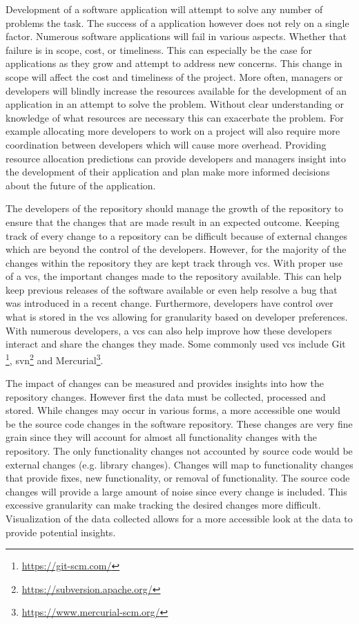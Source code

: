 Development of a software application will attempt to solve any number of problems the task. The success of a application however does not rely on a single factor. Numerous software applications will fail in various aspects. Whether that failure is in scope, cost, or timeliness. This can especially be the case for applications as they grow and attempt to address new concerns. This change in scope will affect the cost and timeliness of the project. More often, managers or developers will blindly increase the resources available for the development of an application in an attempt to solve the problem. Without clear understanding or knowledge of what resources are necessary this can exacerbate the problem. For example allocating more developers to work on a project will also require more coordination between developers which will cause more overhead. Providing resource allocation predictions can provide developers and managers insight into the development of their application and plan make more informed decisions about the future of the application.



The developers of the repository should manage the growth of the repository to ensure that the changes that are made result in an expected outcome. Keeping track of every change to a repository can be difficult because of external changes which are beyond the control of the developers. However, for the majority of the changes within the repository they are kept track through \gls{vcs}. With proper use of a \gls{vcs}, the important changes made to the repository available. This can help keep previous releases of the software available or even help resolve a bug that was introduced in a recent change. Furthermore, developers have control over what is stored in the \gls{vcs} allowing for granularity based on developer preferences. With numerous developers, a \gls{vcs} can also help improve how these developers interact and share the changes they made. Some commonly used \gls{vcs} include Git \footnote{\url{https://git-scm.com/}}, \gls{svn}\footnote{\url{https://subversion.apache.org/}} and Mercurial\footnote{\url{https://www.mercurial-scm.org/}}.

The impact of changes can be measured and provides insights into how the repository changes. However first the data must be collected, processed and stored. While changes may occur in various forms, a more accessible one would be the source code changes in the software repository. These changes are very fine grain since they will account for almost all functionality changes with the repository. The only functionality changes not accounted by source code would be external changes (e.g. library changes). Changes will map to functionality changes that provide fixes, new functionality, or removal of functionality. The source code changes will provide a large amount of noise since every change is included. This excessive granularity can make tracking the desired changes more difficult. Visualization of the data collected allows for a more accessible look at the data to provide potential insights.


